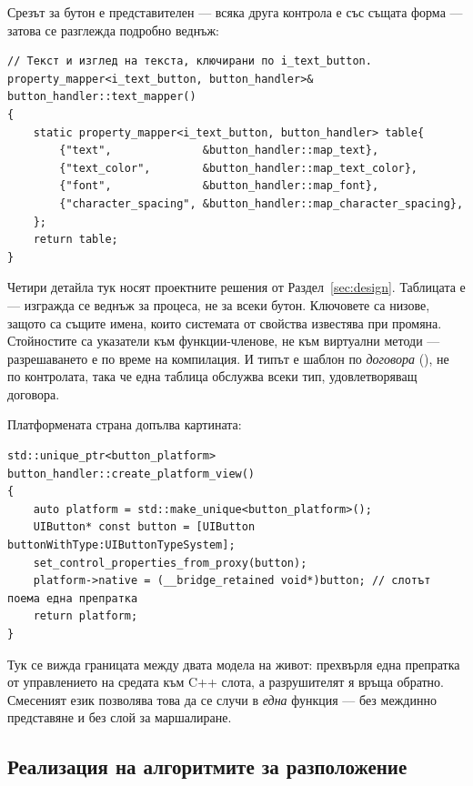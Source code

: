 Срезът за бутон е представителен --- всяка друга контрола е със същата форма ---
затова се разглежда подробно веднъж:

\begin{lstlisting}[caption={Таблицата за свойства на обработчика за бутон},label={lst:button_handler}]
// Текст и изглед на текста, ключирани по i_text_button.
property_mapper<i_text_button, button_handler>& button_handler::text_mapper()
{
    static property_mapper<i_text_button, button_handler> table{
        {"text",              &button_handler::map_text},
        {"text_color",        &button_handler::map_text_color},
        {"font",              &button_handler::map_font},
        {"character_spacing", &button_handler::map_character_spacing},
    };
    return table;
}
\end{lstlisting}

Четири детайла тук носят проектните решения от Раздел~\ref{sec:design}. Таблицата е
 --- изгражда се веднъж за процеса, не за всеки бутон. Ключовете са низове,
защото са същите имена, които системата от свойства известява при промяна. Стойностите са
указатели към функции-членове, не към виртуални методи --- разрешаването е по време на
компилация. И типът е шаблон по \emph{договора} (), не по контролата,
така че една таблица обслужва всеки тип, удовлетворяващ договора.

Платформената страна допълва картината:

\begin{lstlisting}[caption={Създаване на native контролата (iOS)},label={lst:button_ios}]
std::unique_ptr<button_platform> button_handler::create_platform_view()
{
    auto platform = std::make_unique<button_platform>();
    UIButton* const button = [UIButton buttonWithType:UIButtonTypeSystem];
    set_control_properties_from_proxy(button);
    platform->native = (__bridge_retained void*)button; // слотът поема една препратка
    return platform;
}
\end{lstlisting}

Тук се вижда границата между двата модела на живот:  прехвърля
една препратка от управлението на средата към C++ слота, а разрушителят я връща обратно.
Смесеният език позволява това да се случи в \emph{една} функция --- без междинно
представяне и без слой за маршалиране.

\subsection{Реализация на алгоритмите за разположение}
\label{subsec:layout_impl}

